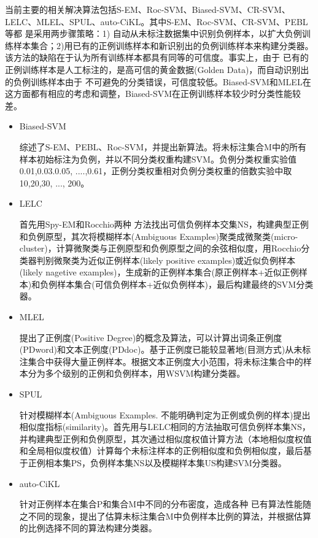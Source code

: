 
当前主要的相关解决算法包括S-EM\cite{liu2002partially}、Roc-SVM\cite{li2003learning}、Biased-SVM\cite{1250918}、CR-SVM\cite{li2010negative}、LELC\cite{li2009positive}、MLEL\cite{AAAI113583}、SPUL\cite{xiao2011similarity}、auto-CiKL\cite{hu2012estimate}。其中S-EM、Roc-SVM、CR-SVM、PEBL等都 是采用两步骤策略：1) 自动从未标注数据集中识别负例样本，以扩大负例训练样本集合；2)用已有的正例训练样本和新识别出的负例训练样本来构建分类器。该方法的缺陷在于认为所有训练样本都具有同等的可信度。事实上，由于 已有的正例训练样本是人工标注的，是高可信的黄金数据(Golden Data)，而自动识别出的负例训练样本由于 不可避免的分类错误，可信度较低。Biased-SVM和MLEL在这方面都有相应的考虑和调整，Biased-SVM在正例训练样本较少时分类性能较差\cite{AAAI113583}。

\begin{itemize}
\item Biased-SVM\cite{1250918}

\citet{1250918}综述了S-EM、PEBL、Roc-SVM，并提出新算法\cite{1250918}。将未标注集合M中的所有样本初始标注为负例，并以不同分类权重构建SVM。负例分类权重实验值0.01,0.03.0.05, ....,0.61，正例分类权重相对负例分类权重的倍数实验中取10,20,30, ..., 200。

\item LELC\cite{li2009positive}

\citet{li2009positive}首先用Spy-EM和Rocchio两种 方法找出可信负例样本交集NS，构建典型正例和负例原型，其次将模糊样本(Ambiguous Examples)聚类成微聚类(micro-cluster)，计算微聚类与正例原型和负例原型之间的余弦相似度，用Rocchio分类器判别微聚类为近似正例样本(likely positive examples)或近似负例样本(likely nagetive examples)，生成新的正例样本集合(原正例样本+近似正例样本)和负例样本集合(可信负例样本+近似负例样本)，最后构建最终的SVM分类器。

\item MLEL\cite{AAAI113583}

\citet{AAAI113583}提出了正例度(Positive Degree)的概念及算法\cite{AAAI113583}，可以计算出词条正例度(PDword)和文本正例度(PDdoc)。基于正例度已能较显著地(目测方式)从未标注集合中获得大量正例样本。根据文本正例度大小范围，将未标注集合中的样本分为多个级别的正例和负例样本，用WSVM构建分类器。

\item SPUL\cite{xiao2011similarity} 

\citet{xiao2011similarity}针对模糊样本(Ambiguous Examples. 不能明确判定为正例或负例的样本)提出相似度指标(similarity)。首先用与LELC相同的方法抽取可信负例样本集NS，并构建典型正例和负例原型，其次通过相似度权值计算方法（本地相似度权值和全局相似度权值）计算每个未标注样本的正例相似度和负例相似度，最后基于正例相本集PS，负例样本集NS以及模糊样本集US构建SVM分类器。

\item auto-CiKL\cite{hu2012estimate}

\citet{hu2012estimate}针对正例样本在集合P和集合M中不同的分布密度，造成各种 已有算法性能随之不同的现象，提出了估算未标注集合M中负例样本比例的算法，并根据估算的比例选择不同的算法构建分类器。



\end{itemize}

